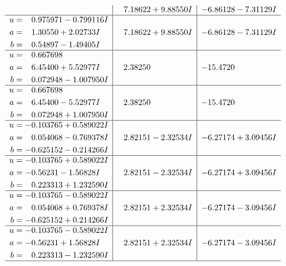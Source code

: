 \documentclass[1p]{elsarticle_modified}
\theoremstyle{definition}
\begin{document}
$$\begin{array}{c|c|c}
 & \phantom{-}7.18622 + 9.88550 I & -6.86128 - 7.31129 I \\ \hline\begin{aligned}
u &= \phantom{-}0.975971 - 0.799116 I \\
a &= \phantom{-}1.30550 + 2.02733 I \\
b &= \phantom{-}0.54897 - 1.49405 I\end{aligned}
 & \phantom{-}7.18622 + 9.88550 I & -6.86128 - 7.31129 I \\ \hline\begin{aligned}
u &= \phantom{-}0.667698\phantom{ +0.000000I} \\
a &= \phantom{-}6.45400 + 5.52977 I \\
b &= \phantom{-}0.072948 - 1.007950 I\end{aligned}
 & \phantom{-}2.38250\phantom{ +0.000000I} & -15.4720\phantom{ +0.000000I} \\ \hline\begin{aligned}
u &= \phantom{-}0.667698\phantom{ +0.000000I} \\
a &= \phantom{-}6.45400 - 5.52977 I \\
b &= \phantom{-}0.072948 + 1.007950 I\end{aligned}
 & \phantom{-}2.38250\phantom{ +0.000000I} & -15.4720\phantom{ +0.000000I} \\ \hline\begin{aligned}
u &= -0.103765 + 0.589022 I \\
a &= \phantom{-}0.054068 - 0.769378 I \\
b &= -0.625152 - 0.214266 I\end{aligned}
 & \phantom{-}2.82151 - 2.32534 I & -6.27174 + 3.09456 I \\ \hline\begin{aligned}
u &= -0.103765 + 0.589022 I \\
a &= -0.56231 - 1.56828 I \\
b &= \phantom{-}0.223313 + 1.232590 I\end{aligned}
 & \phantom{-}2.82151 - 2.32534 I & -6.27174 + 3.09456 I \\ \hline\begin{aligned}
u &= -0.103765 - 0.589022 I \\
a &= \phantom{-}0.054068 + 0.769378 I \\
b &= -0.625152 + 0.214266 I\end{aligned}
 & \phantom{-}2.82151 + 2.32534 I & -6.27174 - 3.09456 I \\ \hline\begin{aligned}
u &= -0.103765 - 0.589022 I \\
a &= -0.56231 + 1.56828 I \\
b &= \phantom{-}0.223313 - 1.232590 I\end{aligned}
 & \phantom{-}2.82151 + 2.32534 I & -6.27174 - 3.09456 I\\
 \hline 
 \end{array}$$\newpage\newpage\renewcommand{\arraystretch}{1}
\end{document}
